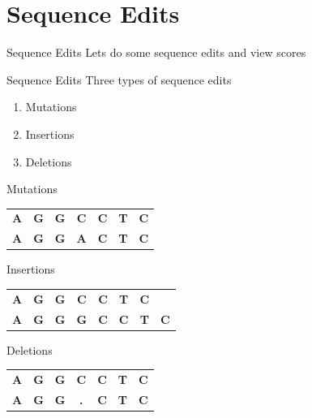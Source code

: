 \documentclass{bredelebeamer}
\begin{document}
\section{Sequence Edits}
\begin{frame}{}
    \tableofcontents[currentsection]
\end{frame}
\begin{frame}{Sequence Edits}
    \large{Lets do some sequence edits and view scores}
\end{frame}
\begin{frame}{Sequence Edits}
    \large{Three types of sequence edits}
        \begin{enumerate}
            \item Mutations
            \item Insertions
            \item Deletions
        \end{enumerate}
\end{frame}
\begin{frame}{Mutations}
    \begin{table}[]
        \begin{tabular}{ccccccc}
        \textbf{A} & \textbf{G} & \textbf{G} & \textbf{C}                        & \textbf{C} & \textbf{T} & \textbf{C} \\
        \textbf{A} & \textbf{G} & \textbf{G} & {\color[HTML]{FE0000} \textbf{A}} & \textbf{C} & \textbf{T} & \textbf{C}
        \end{tabular}
    \end{table}
\end{frame}
\begin{frame}{Insertions}
    \begin{table}[]
        \begin{tabular}{cccccccc}
        \textbf{A} & \textbf{G} & \textbf{G} & \textbf{C}                        & \textbf{C} & \textbf{T} & \textbf{C} &            \\
        \textbf{A} & \textbf{G} & \textbf{G} & {\color[HTML]{FE0000} \textbf{G}} & \textbf{C} & \textbf{C} & \textbf{T} & \textbf{C}
        \end{tabular}
    \end{table}
\end{frame}
\begin{frame}{Deletions}
    \begin{table}[]
\begin{tabular}{ccccccc}
\textbf{A} & \textbf{G} & \textbf{G} & \textbf{C}                        & \textbf{C} & \textbf{T} & \textbf{C} \\
\textbf{A} & \textbf{G} & \textbf{G} & {\color[HTML]{FE0000} \textbf{.}} & \textbf{C} & \textbf{T} & \textbf{C}
\end{tabular}
\end{table}
\end{frame}
\end{document}

